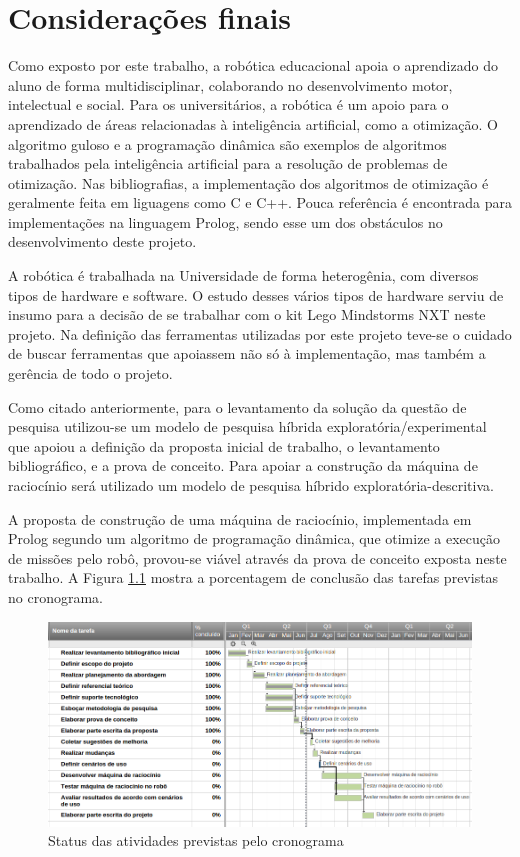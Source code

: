 \chapter{Considerações finais}


Como exposto por este trabalho, a robótica educacional apoia o aprendizado do aluno de forma multidisciplinar, colaborando no desenvolvimento motor, intelectual e social. Para os universitários, a robótica é um apoio para o aprendizado de áreas relacionadas à inteligência artificial, como a otimização. O algoritmo guloso e a programação dinâmica são exemplos de algoritmos trabalhados pela inteligência artificial para a resolução de problemas de otimização. Nas bibliografias, a implementação dos algoritmos de otimização é geralmente feita em liguagens como C e C++. Pouca referência é encontrada para implementações na linguagem Prolog, sendo esse um dos obstáculos no desenvolvimento deste projeto. 

A robótica é trabalhada na Universidade de forma heterogênia, com diversos tipos de hardware e software. O estudo desses vários tipos de hardware serviu de insumo para a decisão de se trabalhar com o kit Lego Mindstorms NXT neste projeto. Na definição das ferramentas utilizadas por este projeto teve-se o cuidado de buscar ferramentas que apoiassem não só à implementação, mas também a gerência de todo o projeto. 

Como citado anteriormente, para o levantamento da solução da questão de pesquisa utilizou-se um modelo de pesquisa híbrida exploratória/experimental que apoiou a definição da proposta inicial de trabalho, o levantamento bibliográfico, e a prova de conceito. Para apoiar a construção da máquina de raciocínio será utilizado um modelo de pesquisa híbrido exploratória-descritiva.

A proposta de construção de uma máquina de raciocínio, implementada em Prolog segundo um algoritmo de programação dinâmica, que otimize a execução de missões pelo robô, provou-se viável através da prova de conceito exposta neste trabalho. A Figura \ref{status} mostra a porcentagem de conclusão das tarefas previstas no cronograma.



\FloatBarrier
\begin{figure}[!h]
\centering
\includegraphics[keepaspectratio=true,scale=0.5]{figuras/status.png}
\caption{Status das atividades previstas pelo cronograma}
\label{status}
\end{figure}
 
